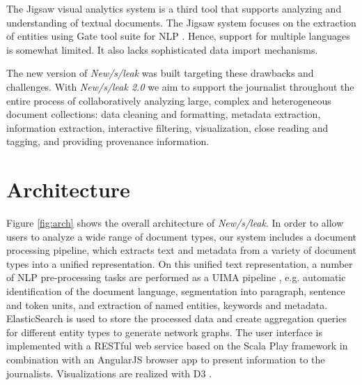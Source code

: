 \documentclass[11pt,a4paper]{article}
\begin{document}
The Jigsaw visual analytics \cite{Carsten2014} system is a third tool that supports analyzing and understanding of textual documents. The Jigsaw system focuses on the extraction of entities using Gate tool suite for NLP \cite{Cunningham.2013}. Hence, support for multiple languages is somewhat limited. It also lacks sophisticated data import mechanisms.


The new version of \emph{New/s/leak} was built targeting these drawbacks and challenges. With \emph{New/s/leak 2.0} we aim to support the journalist throughout the entire process of collaboratively analyzing large, complex and heterogeneous document collections: data cleaning and formatting, metadata extraction, information extraction, interactive filtering, visualization, close reading and tagging, and providing provenance information. 



\section{Architecture}
\label{arch}
Figure \ref{fig:arch} shows the overall architecture of \emph{New/s/leak}. In order to allow users to analyze a wide range of document types, our system includes a document processing pipeline, which extracts text and metadata from a variety of document types into a unified representation. On this unified text representation, a number of NLP pre-processing tasks are performed as a UIMA pipeline \cite{Ferrucci.2004b}, e.g. automatic identification of the document language, segmentation into paragraph, sentence and token units, and extraction of named entities, keywords and metadata. ElasticSearch is used to store the processed data and create aggregation queries for different entity types to generate network graphs. The user interface is implemented with a RESTful web service based on the Scala Play framework in combination with an AngularJS browser app to present information to the journalists. Visualizations are realized with D3 \cite{Bostock.2011}. 
\end{document}
